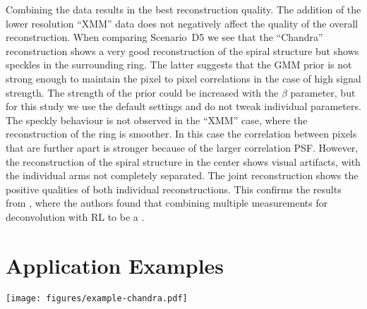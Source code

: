\documentclass[twocolumn, linenumbers]{aastex631}
\newcommand{\chandra}{\textit{Chandra}~}
\newcommand{\jolideco}{\textit{Jolideco}~}
\begin{document}
    Combining the data results in the best reconstruction quality. The addition of the lower resolution \enquote{XMM} data does not negatively affect the quality of the overall reconstruction. When comparing Scenario~D5 we see that the \enquote{Chandra} reconstruction shows a very good reconstruction of the spiral structure but shows speckles in the surrounding ring. The latter suggests that the GMM prior is not strong enough to maintain the pixel to pixel correlations in the case of high signal strength. The strength of the prior could be increased with the $\beta$ parameter, but for this study we use the default settings and do not tweak individual parameters. The speckly behaviour is not observed in the \enquote{XMM} case, where the reconstruction of the ring is smoother. In this case the correlation between pixels that are further apart is stronger because of the larger correlation PSF. However, the reconstruction of the spiral structure in the center shows visual artifacts, with the individual arms not completely separated. The joint reconstruction shows the positive qualities of both individual reconstructions. This confirms the results from \cite{Ingaramo2014}, where the authors found that combining multiple measurements for deconvolution with RL to be a .

    \section{Application Examples}
    \begin{figure*}
        \begin{centering}
            \texttt{[image: figures/example-chandra.pdf]}
            \caption{
               \jolideco result with the JWST patch prior for \chandra observations of SNR \textit{1E~0102.2–7219}. The bottom left image shows the summed counts from 25 observations. The bottom right image  shows the the \jolideco deconvolution. The flux is given as a counts rate relative to obsID 1308. The panels \textit{Zoom A}, \textit{Zoom B} and \textit{Zoom C} show a zoomed-in version of three example regions in the SNR, marked with the white rectangles in the large images. The colormap and scale used in the zoom insets is the same as used for the larger images.
            }
            \label{fig:example-chandra}
        \end{centering}
    \end{figure*}
\end{document}
